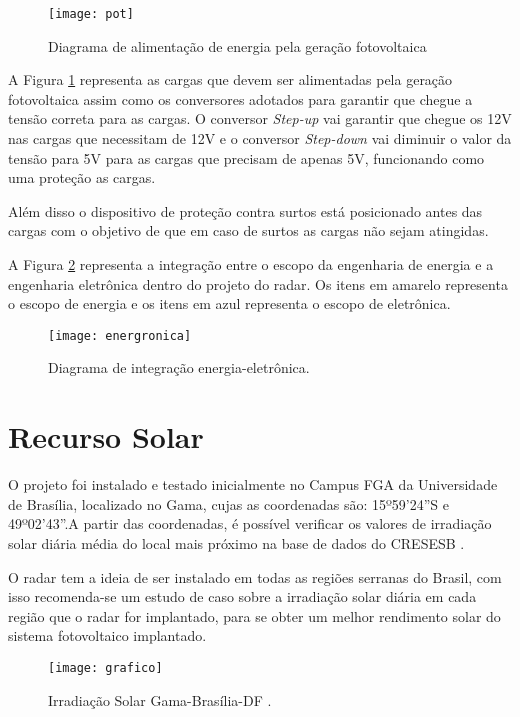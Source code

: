 \begin{figure}[H]
\centering 
\texttt{[image: pot]}
\caption{\label{fig30}Diagrama de alimentação de energia pela geração fotovoltaica }
\end{figure}

A Figura \ref{fig30} representa as cargas que devem ser alimentadas pela geração fotovoltaica assim como os conversores adotados para garantir que chegue a tensão correta para as cargas. O conversor \textit{Step-up} vai garantir que chegue os 12V nas cargas que necessitam de 12V e o conversor \textit{Step-down} vai diminuir o valor da tensão para 5V para as cargas que precisam de apenas 5V, funcionando como uma proteção as cargas.

Além disso o dispositivo de proteção contra surtos está posicionado antes das cargas com o objetivo de que em caso de surtos as cargas não sejam atingidas. 

A Figura \ref{fig31} representa a integração entre o escopo da engenharia de energia e a engenharia eletrônica dentro do projeto do radar. Os itens em amarelo representa o escopo de energia e os itens em azul representa o escopo de eletrônica.

\begin{figure}[H]
\centering 
\texttt{[image: energronica]}
\caption{\label{fig31}Diagrama de integração energia-eletrônica.}
\end{figure}

\section{Recurso Solar}

O projeto foi instalado e testado inicialmente no Campus FGA da Universidade de Brasília, localizado no Gama, cujas as coordenadas são: 15º59’24”S e 49º02’43”.A partir das coordenadas, é possível verificar os valores de irradiação solar diária média do local mais próximo na base de dados do CRESESB \cite{solar}.

O radar tem a ideia de ser instalado em todas as regiões serranas do Brasil, com isso recomenda-se um estudo de caso sobre a irradiação solar diária em cada região que o radar for implantado, para se obter um melhor rendimento solar do sistema fotovoltaico implantado. 
\begin{figure}[H]
\centering
\texttt{[image: grafico]}
\caption{Irradiação Solar Gama-Brasília-DF \cite{solar}.}
\label{fig:grafico}
\end{figure}

